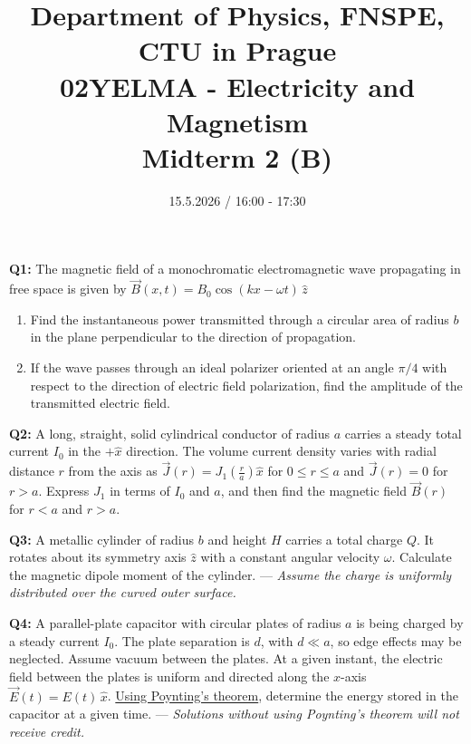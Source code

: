 \documentclass[a4paper,12pt]{article}
\title{{\large Department of Physics, FNSPE, CTU in Prague} \\
                  02YELMA - Electricity and Magnetism \\ 
          {\Large \textbf{Midterm 2 (B)}}\vspace{-1cm}}
\date{15.5.2026 / 16:00 - 17:30}
\author{}
\begin{document}
\maketitle

\textbf{Q1:} The magnetic field of a monochromatic electromagnetic wave propagating in free space is given by $\vec{B}(x,t)=B_0\cos(kx-\omega t)\,\hat{z}$
\begin{enumerate}
    \item[(a)] Find the instantaneous power transmitted through a circular area of radius \(b\) in the plane perpendicular to the direction of propagation.
    
    \item[(b)] If the wave passes through an ideal polarizer oriented at an angle \(\pi/4\) with respect to the direction of electric field polarization, find the amplitude of the transmitted electric field.
\end{enumerate}

\vspace*{0.3cm}

\textbf{Q2:} A long, straight, solid cylindrical conductor of radius \(a\) carries a steady total current \(I_0\) in the \(+\hat{x}\) direction. The volume current density varies with radial distance \(r\) from the axis as $\vec{J}(r)=J_1\left(\frac{r}{a}\right)\hat{x}$ for $0\le r\le a$ and \(\vec{J}(r)=0\) for \(r>a\). Express \(J_1\) in terms of \(I_0\) and \(a\), and then find the magnetic field \(\vec{B}(r)\) for \(r<a\) and \(r>a\).

\vspace*{0.3cm}

\textbf{Q3:} A metallic cylinder of radius \(b\) and height \(H\) carries a total charge \(Q\). It rotates about its symmetry axis \(\hat{z}\) with a constant angular velocity \(\omega\). Calculate the magnetic dipole moment of the cylinder. --- \textit{Assume the charge is uniformly distributed over the curved outer surface.}

\vspace*{0.3cm}

\textbf{Q4:} A parallel-plate capacitor with circular plates of radius \(a\) is being charged by a steady current \(I_0\). The plate separation is \(d\), with \(d\ll a\), so edge effects may be neglected. Assume vacuum between the plates. At a given instant, the electric field between the plates is uniform and directed along the \(x\)-axis $\vec{E}(t)=E(t)\,\hat{x}$. \underline{Using Poynting’s theorem}, determine the energy stored in the capacitor at a given time. --- \textit{Solutions without using Poynting’s theorem will not receive credit.}
\end{document}
